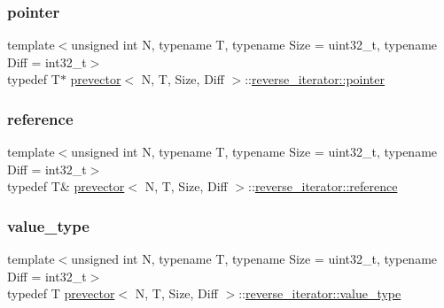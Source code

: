 \subsubsection{\texorpdfstring{pointer}{pointer}}
{\footnotesize\ttfamily template$<$unsigned int N, typename T, typename Size = uint32\+\_\+t, typename Diff = int32\+\_\+t$>$ \\
typedef T$\ast$ \mbox{\hyperlink{classprevector}{prevector}}$<$ N, T, Size, Diff $>$\+::\mbox{\hyperlink{classprevector_1_1reverse__iterator_affd9dcd9ef382da1f07f4194997f5a66}{reverse\+\_\+iterator\+::pointer}}}

\mbox{\label{classprevector_1_1reverse__iterator_acc7b6fc472e53e0e33b42a089499b475}} 
\subsubsection{\texorpdfstring{reference}{reference}}
{\footnotesize\ttfamily template$<$unsigned int N, typename T, typename Size = uint32\+\_\+t, typename Diff = int32\+\_\+t$>$ \\
typedef T\& \mbox{\hyperlink{classprevector}{prevector}}$<$ N, T, Size, Diff $>$\+::\mbox{\hyperlink{classprevector_1_1reverse__iterator_acc7b6fc472e53e0e33b42a089499b475}{reverse\+\_\+iterator\+::reference}}}

\mbox{\label{classprevector_1_1reverse__iterator_a3d18023700976ec30e7d6076285d3253}} 
\subsubsection{\texorpdfstring{value\+\_\+type}{value\_type}}
{\footnotesize\ttfamily template$<$unsigned int N, typename T, typename Size = uint32\+\_\+t, typename Diff = int32\+\_\+t$>$ \\
typedef T \mbox{\hyperlink{classprevector}{prevector}}$<$ N, T, Size, Diff $>$\+::\mbox{\hyperlink{classprevector_1_1reverse__iterator_a3d18023700976ec30e7d6076285d3253}{reverse\+\_\+iterator\+::value\+\_\+type}}}



